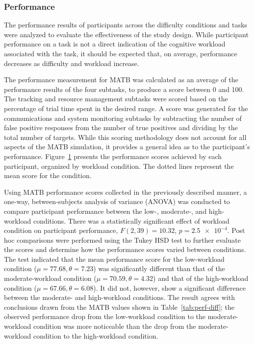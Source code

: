 \documentclass[11pt]{article}
\begin{document}
		\subsubsection{Performance}
		The performance results of participants across the difficulty conditions and tasks were analyzed to evaluate the effectiveness of the study design. While participant performance on a task is not a direct indication of the cognitive workload associated with the task, it should be expected that, on average, performance decreases as difficulty and workload increase.  

		The performance measurement for MATB was calculated as an average of the performance results of the four subtasks, to produce a score between 0 and 100. The tracking and resource management subtasks were scored based on the percentage of trial time spent in the desired range. A score was generated for the communications and system monitoring subtasks by subtracting the number of false positive responses from the number of true positives and dividing by the total number of targets. While this scoring methodology does not account for all aspects of the MATB simulation, it provides a general idea as to the participant's performance. Figure~\ref{fig:matb-perf} presents the performance scores achieved by each participant, organized by workload condition. The dotted lines represent the mean score for the condition. 
		
		\begin{figure}
		\centering
		\caption{}
		\label{fig:matb-perf}
		\end{figure} 
		
		Using MATB performance scores collected in the previously described manner, a one-way, between-subjects analysis of variance (ANOVA) was conducted to compare participant performance between the low-, moderate-, and high-workload conditions. There was a statistically significant effect of workload condition on participant performance, \(F(2, 39) = 10.32\), \(p = \num{2.5e-4}\). Post hoc comparisons were performed using the Tukey HSD test to further evaluate the scores and determine how the performance scores varied between conditions. The test indicated that the mean performance score for the low-workload condition (\(\mu = 77.68, \theta = 7.23\)) was significantly different than that of the moderate-workload condition (\(\mu = 70.59, \theta = 4.32\)) and that of the high-workload condition (\(\mu = 67.66, \theta = 6.08\)). It did not, however, show a significant difference between the moderate- and high-workload conditions. The result agrees with conclusions drawn from the MATB values shown in Table~\ref{tab:perf-diff}; the observed performance drop from the low-workload condition to the moderate-workload condition was more noticeable than the drop from the moderate-workload condition to the high-workload condition.
		
\end{document}
